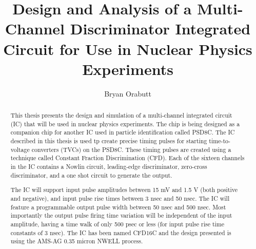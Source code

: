 \documentclass[12pt,oneside,final]{siuethesis}
\author{Bryan Orabutt}
\title{Design and Analysis of a Multi-Channel Discriminator Integrated Circuit for Use in Nuclear Physics Experiments}
\theoremstyle{definition}
\begin{document}
\maketitle 

\frontmatter %

\copyrightpage %



\begin{abstract}

\par This thesis presents the design and simulation of a multi-channel integrated circuit (IC) that will be used in nuclear physics experiments. The chip is being designed as a companion chip for another IC used in particle identification called PSD8C. The IC described in this thesis is used tp create precise timing pulses for starting time-to-voltage converters (TVCs) on the PSD8C. These timing pulses are created using a technique called Constant Fraction Discrimination (CFD). Each of the sixteen channels in the IC contains a Nowlin circuit, leading-edge discriminator, zero-cross discriminator, and a one shot circuit to generate the output. \par The IC will support input pulse amplitudes between 15 mV and 1.5 V (both positive and negative), and input pulse rise times between 3 nsec and 50 nsec. The IC will feature a programmable output pulse width between 50 nsec and 500 nsec. Most importantly the output pulse firing time variation will be independent of the input amplitude, having a time walk of only 500 psec or less (for input pulse rise time constants of 3 nsec). The IC has been named CFD16C and the design presented is using the AMS-AG 0.35 micron NWELL process.
\end{abstract}


\end{document}
